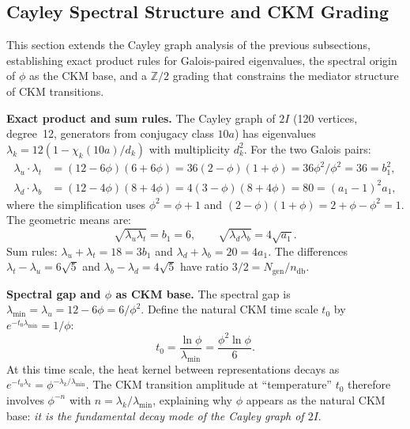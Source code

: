 \documentclass[12pt,a4paper]{article}
\theoremstyle{definition}
\begin{document}
\subsection{Cayley Spectral Structure and CKM Grading}
\label{sec:S-cayley-spectral}

This section extends the Cayley graph analysis of the previous subsections, establishing exact product rules for Galois-paired eigenvalues, the spectral origin of $\phi$ as the CKM base, and a $\mathbb{Z}/2$ grading that constrains the mediator structure of CKM transitions.

\textbf{Exact product and sum rules.}  The Cayley graph of $2I$ (120 vertices, degree~12, generators from conjugacy class $10a$) has eigenvalues $\lambda_k = 12(1 - \chi_k(10a)/d_k)$ with multiplicity $d_k^2$.  For the two Galois pairs:
\begin{align}
\lambda_u \cdot \lambda_t &= (12 - 6\phi)(6 + 6\phi) = 36(2 - \phi)(1 + \phi) = 36\phi^2 / \phi^2 = 36 = b_1^2, \label{eq:cayley_prod_ut} \\
\lambda_d \cdot \lambda_b &= (12 - 4\phi)(8 + 4\phi) = 4(3 - \phi)(8 + 4\phi) = 80 = (a_1 - 1)^2 a_1, \label{eq:cayley_prod_db}
\end{align}
where the simplification uses $\phi^2 = \phi + 1$ and $(2-\phi)(1+\phi) = 2 + \phi - \phi^2 = 1$.  The geometric means are:
\begin{equation}
\sqrt{\lambda_u \lambda_t} = b_1 = 6, \qquad
\sqrt{\lambda_d \lambda_b} = 4\sqrt{a_1}.
\end{equation}
Sum rules: $\lambda_u + \lambda_t = 18 = 3b_1$ and $\lambda_d + \lambda_b = 20 = 4a_1$.  The differences $\lambda_t - \lambda_u = 6\sqrt{5}$ and $\lambda_b - \lambda_d = 4\sqrt{5}$ have ratio $3/2 = N_{\text{gen}}/n_{\text{db}}$.

\textbf{Spectral gap and $\phi$ as CKM base.}  The spectral gap is $\lambda_{\min} = \lambda_u = 12 - 6\phi = 6/\phi^2$.  Define the natural CKM time scale $t_0$ by $e^{-t_0 \lambda_{\min}} = 1/\phi$:
\begin{equation}
t_0 = \frac{\ln\phi}{\lambda_{\min}} = \frac{\phi^2 \ln\phi}{6}.
\end{equation}
At this time scale, the heat kernel between representations decays as $e^{-t_0 \lambda_k} = \phi^{-\lambda_k/\lambda_{\min}}$.  The CKM transition amplitude at ``temperature'' $t_0$ therefore involves $\phi^{-n}$ with $n = \lambda_k / \lambda_{\min}$, explaining why $\phi$ appears as the natural CKM base: \emph{it is the fundamental decay mode of the Cayley graph of $2I$}.
\end{document}
